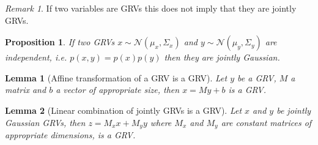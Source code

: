 \documentclass[]{hsrzf}
\theoremstyle{plain}
\newtheorem{lemma}{Lemma}[section]
\newtheorem{prop}{Proposition}[section]
\theoremstyle{definition}
\theoremstyle{remark}
\newtheorem*{remark}{Remark}
\begin{document}
\begin{remark}
  If two variables are GRVs this does not imply that they are jointly GRVs.
\end{remark}

\begin{prop} \label{lem:independent-grvs-joint}
  If two GRVs $x \sim \mathcal{N}(\mu_x, \Sigma_x)$ and $y \sim
  \mathcal{N}(\mu_y, \Sigma_y)$ are independent, i.e. $p(x,y) = p(x)p(y)$
  then they are jointly Gaussian.
\end{prop}

\begin{lemma}[Affine transformation of a GRV is a GRV]
  \label{lem:affine-grv}
  Let $y$ be a GRV, $M$ a matrix and $b$ a vector of appropriate size, then $x
  = My + b$ is a GRV.
\end{lemma}

\begin{lemma}[Linear combination of jointly GRVs is a GRV]
  Let $x$ and $y$ be jointly Gaussian GRVs, then $z = M_x x + M_y y$ where
  $M_x$ and $M_y$ are constant matrices of appropriate dimensions, is a GRV.

\end{lemma}
\end{document}
